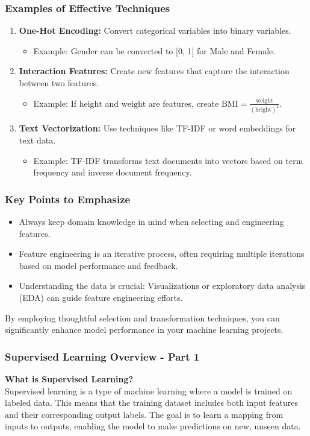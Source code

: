 \documentclass[aspectratio=169]{beamer}
\begin{document}
\begin{frame}[fragile]
  \frametitle{Examples of Effective Techniques}
  \begin{enumerate}
    \item \textbf{One-Hot Encoding:} Convert categorical variables into binary variables.
      \begin{itemize}
        \item Example: Gender can be converted to [0, 1] for Male and Female.
      \end{itemize}
    \item \textbf{Interaction Features:} Create new features that capture the interaction between two features.
      \begin{itemize}
        \item Example: If \( \text{height} \) and \( \text{weight} \) are features, create \( \text{BMI} = \frac{\text{weight}}{(\text{height})^2} \).
      \end{itemize}
    \item \textbf{Text Vectorization:} Use techniques like TF-IDF or word embeddings for text data.
      \begin{itemize}
        \item Example: TF-IDF transforms text documents into vectors based on term frequency and inverse document frequency.
      \end{itemize}
  \end{enumerate}
\end{frame}

\begin{frame}[fragile]
  \frametitle{Key Points to Emphasize}
  \begin{itemize}
    \item Always keep domain knowledge in mind when selecting and engineering features.
    \item Feature engineering is an iterative process, often requiring multiple iterations based on model performance and feedback.
    \item Understanding the data is crucial: Visualizations or exploratory data analysis (EDA) can guide feature engineering efforts.
  \end{itemize}
  By employing thoughtful selection and transformation techniques, you can significantly enhance model performance in your machine learning projects.
\end{frame}

\begin{frame}[fragile]
    \frametitle{Supervised Learning Overview - Part 1}
    \textbf{What is Supervised Learning?} \\
    Supervised learning is a type of machine learning where a model is trained on labeled data. This means that the training dataset includes both input features and their corresponding output labels. The goal is to learn a mapping from inputs to outputs, enabling the model to make predictions on new, unseen data.
\end{frame}
\end{document}
